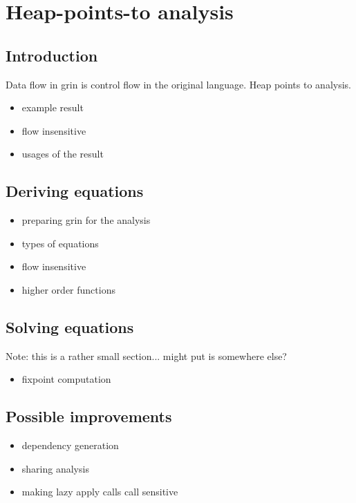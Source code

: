 \documentclass{book}
\begin{document}
\chapter{Heap-points-to analysis}

\section{Introduction}

Data flow in grin is control flow in the original language. Heap points to analysis.

\begin{itemize}
	\item example result
	\item flow insensitive
	\item usages of the result
\end{itemize}

\section{Deriving equations}

\begin{itemize}
	\item preparing grin for the analysis
	\item types of equations
	\item flow insensitive
	\item higher order functions
\end{itemize}

\section{Solving equations}

Note: this is a rather small section... might put is somewhere else?
\begin{itemize}
	\item fixpoint computation
\end{itemize}

\section{Possible improvements}

\begin{itemize}
	\item dependency generation
	\item sharing analysis
	\item making lazy apply calls call sensitive
\end{itemize}
\end{document}

